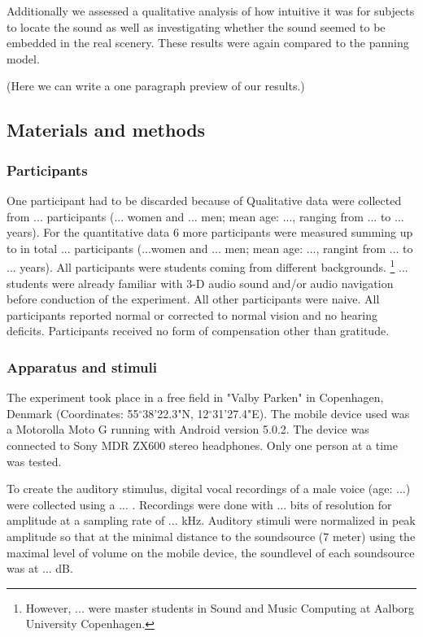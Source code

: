 \documentclass[journal]{IEEEtran}
\begin{document}
Additionally we assessed a qualitative analysis of how intuitive it was for subjects to locate the sound as well as investigating whether the sound seemed to be embedded in the real scenery. These results were again compared to the panning model.

(Here we can write a one paragraph preview of our results.)
\subsection{Materials and methods}
\subsubsection{Participants}
One participant had to be discarded because of 
Qualitative data were collected from ... participants (... women and ... men; mean age: ..., ranging from ... to ... years). For the quantitative data 6 more participants were measured summing up to in total ... participants (...women and ... men; mean age: ..., rangint from ... to ... years). All participants were students coming from different backgrounds. \footnote{However, ... were master students in Sound and Music Computing at Aalborg University Copenhagen.} ... students were already familiar with 3-D audio sound and/or audio navigation before conduction of the experiment. All other participants were naive. All participants reported normal or corrected to normal vision and no hearing deficits. Participants received no form of compensation other than gratitude. 

\subsubsection{Apparatus and stimuli}
The experiment took place in a free field in "Valby Parken" in Copenhagen, Denmark (Coordinates: 55$^\circ$38'22.3"N, 12$^\circ$31'27.4"E). The mobile device used was a Motorolla Moto G running with Android version 5.0.2. The device was connected to Sony MDR ZX600 stereo headphones. Only one person at a time was tested. 

To create the auditory stimulus, digital vocal recordings of a male voice (age: ...) were collected using a ... . Recordings were done with ... bits of resolution for amplitude at a sampling rate of ...  kHz. Auditory stimuli were normalized in peak amplitude so that at the minimal distance to the soundsource (7 meter) using the maximal level of volume on the mobile device, the soundlevel of each soundsource was at ... dB. 
\end{document}

